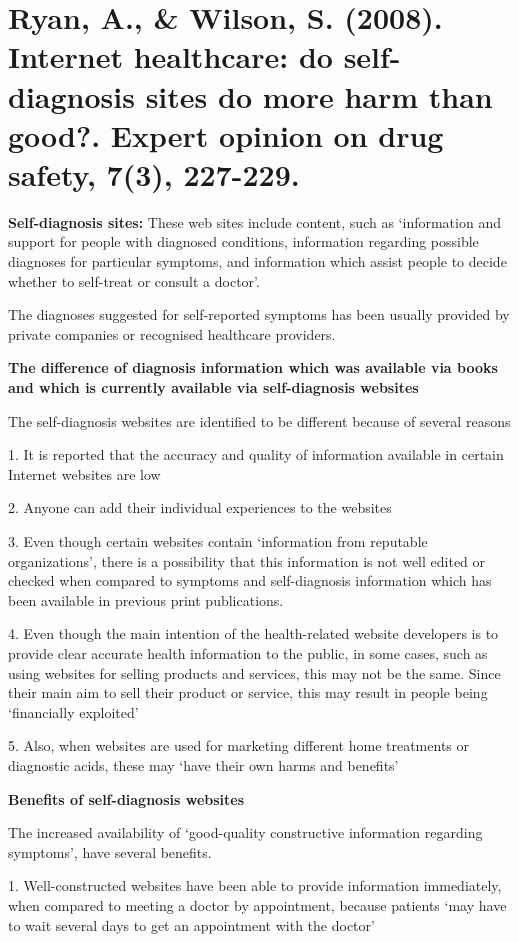 \documentclass[]{article}
\begin{document}
\section{Ryan, A., \& Wilson, S. (2008). Internet healthcare: do self-diagnosis sites do more harm than good?. Expert opinion on drug safety, 7(3), 227-229.}

\textbf{Self-diagnosis sites:} These web sites include content, such as ‘information and support for people with diagnosed conditions, information regarding possible diagnoses for particular symptoms, and information which assist people to decide whether to self-treat or consult a doctor’. 

The diagnoses suggested for self-reported symptoms has been usually provided by private companies or recognised healthcare providers. 

\textbf{The difference of diagnosis information which was available via books and which is currently available via self-diagnosis websites}

The self-diagnosis websites are identified to be different because of several reasons

1.	It is reported that the accuracy and quality of information available in certain Internet websites are low

2.	 Anyone can add their individual experiences to the websites

3.	Even though certain websites contain ‘information from reputable organizations’, there is a possibility that this information is not well edited or checked when compared to symptoms and self-diagnosis information which has been available in previous print publications.

4.	Even though the main intention of the health-related website developers is to provide clear accurate health information to the public, in some cases, such as using websites for selling products and services, this may not be the same. Since their main aim to sell their product or service, this may result in people being ‘financially exploited’

5.	Also, when websites are used for marketing different home treatments or diagnostic acids, these may ‘have their own harms and benefits’

\textbf{Benefits of self-diagnosis websites}

The increased availability of ‘good-quality constructive information regarding symptoms’, have several benefits.     
  
1.	Well-constructed websites have been able to provide information immediately, when compared to meeting a doctor by appointment, because patients ‘may have to wait several days to get an appointment with the doctor’ 
\end{document}
